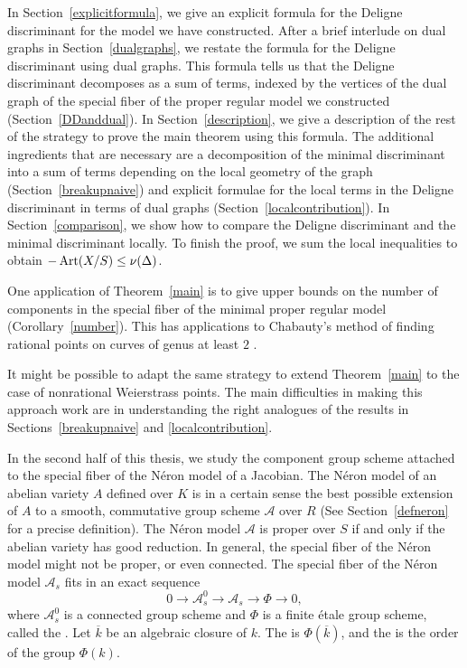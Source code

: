 In Section~\ref{explicitformula}, we give an explicit formula for the Deligne discriminant for the model we have constructed. After a brief interlude on dual graphs in Section~\ref{dualgraphs}, we restate the formula for the Deligne discriminant using dual graphs. This formula tells us that the Deligne discriminant decomposes as a sum of terms, indexed by the vertices of the dual graph of the special fiber of the proper regular model we constructed (Section~\ref{DDanddual}). In Section~\ref{description}, we give a description of the rest of the strategy to prove the main theorem using this formula. The additional ingredients that are necessary are a decomposition of the minimal discriminant into a sum of terms depending on the local geometry of the graph (Section~\ref{breakupnaive}) and explicit formulae for the local terms in the Deligne discriminant in terms of dual graphs (Section~\ref{localcontribution}). In Section~\ref{comparison}, we show how to compare the Deligne discriminant and the minimal discriminant locally. To finish the proof, we sum the local inequalities to obtain $-\operatorname{Art}(X/S) \leq \nu(\Delta)$. 

One application of Theorem~\ref{main} is to give upper bounds on the number of components in the special fiber of the minimal proper regular model (Corollary~\ref{number}). This has applications to Chabauty's method of finding rational points on curves of genus at least $2$ \cite{poonenstoll}. 

It might be possible to adapt the same strategy to extend Theorem~\ref{main} to the case of nonrational Weierstrass points. The main difficulties in making this approach work are in understanding the right analogues of the results in Sections~\ref{breakupnaive} and \ref{localcontribution}.

In the second half of this thesis, we study the component group scheme attached to the special fiber of the N\'{e}ron model of a Jacobian. The N\'{e}ron model of an abelian variety $A$ defined over $K$ is in a certain sense the best possible extension of $A$ to a smooth, commutative group scheme $\mathcal{A}$ over $R$ (See Section~\ref{defneron} for a precise definition). The N\'{e}ron model $\mathcal{A}$ is proper over $S$ if and only if the abelian variety has good reduction. In general, the special fiber of the N\'{e}ron model might not be proper, or even connected. The special fiber of the N\'{e}ron model $\mathcal{A}_s$ fits in an exact sequence 
\[ 0 \rightarrow \mathcal{A}_s^0 \rightarrow \mathcal{A}_s \rightarrow \Phi \rightarrow 0,  \]
where $\mathcal{A}_s^0$ is a connected group scheme and $\Phi$ is a finite \'{e}tale group scheme, called the {}. Let $\overline{k}$ be an algebraic closure of $k$. The {} is $\Phi(\overline{k})$, and the {} is the order of the group $\Phi(k)$. 

